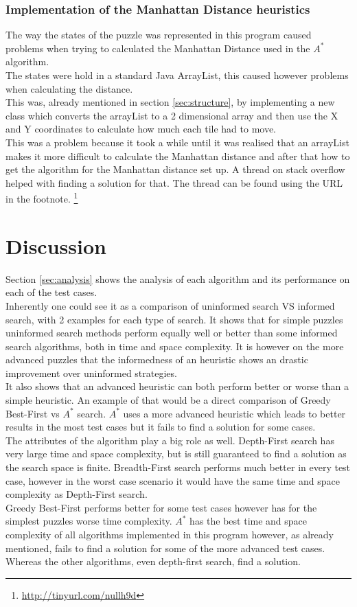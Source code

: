 \documentclass[journal]{IEEEtran}
\begin{document}
\subsubsection{Implementation of the Manhattan Distance heuristics}
The way the states of the puzzle was represented in this program caused problems when trying to calculated the Manhattan Distance used in the $A^*$ algorithm. \\
The states were hold in a standard Java ArrayList, this caused however problems when calculating the distance.\\ 
This was, already mentioned in section \ref{sec:structure}, by implementing a new class which converts the arrayList to a 2 dimensional array and then use the X and Y coordinates to calculate how much each tile had to move.\\
This was a problem because it took a while until it was realised that an arrayList makes it more difficult to calculate the Manhattan distance and after that how to get the algorithm for the Manhattan distance set up. A thread on stack overflow helped with finding a solution for that. The thread can be found using the URL in the footnote. \footnote{\url{http://tinyurl.com/nullh9d}}

\section{Discussion}
Section \ref{sec:analysis} shows the analysis of each algorithm and its performance on each of the test cases. \\
Inherently one could see it as a comparison of uninformed search VS informed search, with 2 examples for each type of search. It shows that for simple puzzles uninformed search methods perform equally well or better than some informed search algorithms, both in time and space complexity. It is however on the more advanced puzzles that the informedness of an heuristic shows an drastic improvement over uninformed strategies. \\
It also shows that an advanced heuristic can both perform better or worse than a simple heuristic. An example of that would be a direct comparison of Greedy Best-First vs $A^*$ search. $A^*$ uses a more advanced heuristic which leads to better results in the most test cases but it fails to find a solution for some cases. \\ 
 
The attributes of the algorithm play a big role as well. Depth-First search has very large time and space complexity, but is still guaranteed to find a solution as the search space is finite. Breadth-First search performs much better in every test case, however in the worst case scenario it would have the same time and space complexity as Depth-First search.\\ 
Greedy Best-First performs better for some test cases however has for the simplest puzzles worse time complexity. $A^*$ has the best time and space complexity of all algorithms implemented in this program however, as already mentioned, fails to find a solution for some of the more advanced test cases. Whereas the other algorithms, even depth-first search, find a solution. \\
\end{document}
